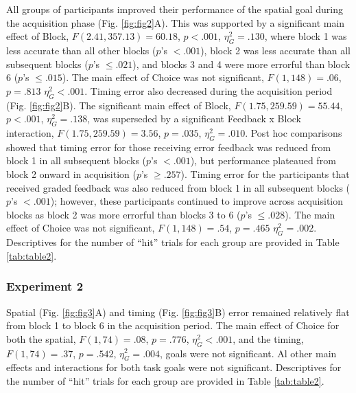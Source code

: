 \documentclass[
  man, donotrepeattitle,floatsintext]{apa7}
\begin{document}
All groups of participants improved their performance of the spatial goal during the acquisition phase (Fig. \ref{fig:fig2}A). This was supported by a significant main effect of Block, \(F(2.41,357.13) = 60.18\), \(p < .001\), \(\eta_{G}^2 = .130\), where block 1 was less accurate than all other blocks (\(p\)'s \(< .001\)), block 2 was less accurate than all subsequent blocks (\(p\)'s \(\leq .021\)), and blocks 3 and 4 were more errorful than block 6 (\(p\)'s \(\leq .015\)). The main effect of Choice was not significant, \(F(1,148) = .06\), \(p = .813\) \(\eta_{G}^2 < .001\). Timing error also decreased during the acquisition period (Fig. \ref{fig:fig2}B). The significant main effect of Block, \(F(1.75,259.59) = 55.44\), \(p < .001\), \(\eta_{G}^2 = .138\), was superseded by a significant Feedback x Block interaction, \(F(1.75, 259.59) = 3.56\), \(p = .035\), \(\eta_{G}^2 = .010\). Post hoc comparisons showed that timing error for those receiving error feedback was reduced from block 1 in all subsequent blocks (\(p\)'s \(< .001\)), but performance plateaued from block 2 onward in acquisition (\(p\)'s \(\geq .257\)). Timing error for the participants that received graded feedback was also reduced from block 1 in all subsequent blocks (\(p\)'s \(< .001\)); however, these participants continued to improve across acquisition blocks as block 2 was more errorful than blocks 3 to 6 (\(p\)'s \(\leq .028\)). The main effect of Choice was not significant, \(F(1,148) = .54\), \(p = .465\) \(\eta_{G}^2 = .002\). Descriptives for the number of ``hit'' trials for each group are provided in Table \ref{tab:table2}.

\hypertarget{experiment-2-3}{%
\subsubsection{Experiment 2}\label{experiment-2-3}}

Spatial (Fig. \ref{fig:fig3}A) and timing (Fig. \ref{fig:fig3}B) error remained relatively flat from block 1 to block 6 in the acquisition period. The main effect of Choice for both the spatial, \(F(1,74) = .08\), \(p = .776\), \(\eta_{G}^2 < .001\), and the timing, \(F(1,74) = .37\), \(p = .542\), \(\eta_{G}^2 = .004\), goals were not significant. Al other main effects and interactions for both task goals were not significant. Descriptives for the number of ``hit'' trials for each group are provided in Table \ref{tab:table2}.
\end{document}
